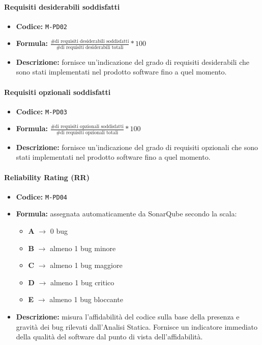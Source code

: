 \documentclass[a4paper,12pt]{article}
\begin{document}
\paragraph{Requisiti desiderabili soddisfatti}
\begin{itemize}
    \item \textbf{Codice:} \texttt{M-PD02} 
    \item \textbf{Formula:} $\frac{\text{\# di requisiti desiderabili soddisfatti}}{\text{\# di requisiti desiderabili totali}}*100$
    \item \textbf{Descrizione:} fornisce un'indicazione del grado di requisiti desiderabili che sono stati implementati nel prodotto software fino a quel momento.
\end{itemize}

\paragraph{Requisiti opzionali soddisfatti}
\begin{itemize}
    \item \textbf{Codice:} \texttt{M-PD03} 
    \item \textbf{Formula:} $\frac{\text{\# di requisiti opzionali soddisfatti}}{\text{\# di requisiti opzionali totali}}*100$
    \item \textbf{Descrizione:} fornisce un'indicazione del grado di requisiti opzionali che sono stati implementati nel prodotto software fino a quel momento. 
\end{itemize}

\paragraph{Reliability Rating (RR)}
\begin{itemize}
\item \textbf{Codice:} \texttt{M-PD04}
\item \textbf{Formula:} assegnata automaticamente da SonarQube secondo la scala:
\begin{itemize}
    \item \textbf{A} $\rightarrow$ 0 bug
    \item \textbf{B} $\rightarrow$ almeno 1 bug minore
    \item \textbf{C} $\rightarrow$ almeno 1 bug maggiore
    \item \textbf{D} $\rightarrow$ almeno 1 bug critico
    \item \textbf{E} $\rightarrow$ almeno 1 bug bloccante
\end{itemize}
\item \textbf{Descrizione:} misura l'affidabilità del codice sulla base della presenza 
e gravità dei bug rilevati dall'Analisi Statica. Fornisce un indicatore immediato della qualità 
del software dal punto di vista dell'affidabilità.
\end{itemize}
\end{document}

